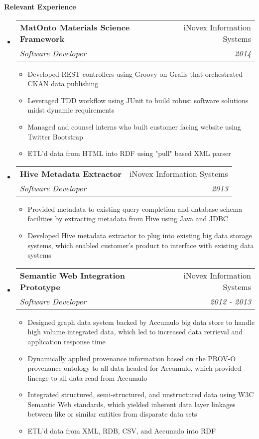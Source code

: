 \documentclass[letterpaper,11pt]{article}
\makeatletter
\newcommand{\resitem}[1]{\item #1 \vspace{-2pt}}
\newcommand{\resheading}[1]{{\large \colorbox{mygrey}{\begin{minipage}{\textwidth}{\textbf{#1 \vphantom{p\^{E}}}}\end{minipage}}}}
\newcommand{\ressubheading}[4]{
\begin{tabular*}{7.0in}{l@{\extracolsep{\fill}}r}
		\textbf{#1} & #2 \\
		\textit{#3} & \textit{#4} \\
\end{tabular*}\vspace{-6pt}}
\makeatother
\begin{document}
\resheading{Relevant Experience}
\begin{itemize}
	\item
	\ressubheading{MatOnto Materials Science Framework}{iNovex Information Systems}{Software Developer}{2014}
	\begin{itemize}
		\resitem{Developed REST controllers using Groovy on Grails that orchestrated CKAN data publishing}
		\resitem{Leveraged TDD workflow using JUnit to build robust software solutions midst dynamic requirements}
		\resitem{Managed and counsel interns who built customer facing website using Twitter Bootstrap}
		\resitem{ETL'd data from HTML into RDF using "pull" based XML parser}
	\end{itemize}

	\item
	\ressubheading{Hive Metadata Extractor}{iNovex Information Systems}{Software Developer}{2013}
	\begin{itemize}
		\resitem{Provided metadata to existing query completion and database schema facilities by extracting metadata from Hive using Java and JDBC}
		\resitem{Developed Hive metadata extractor to plug into existing big data storage systems, which enabled customer's product to interface with existing data systems}
	\end{itemize}
	
	\item
	\ressubheading{Semantic Web Integration Prototype}{iNovex Information Systems}{Software Developer}{2012 - 2013}
	\begin{itemize}
		\resitem{Designed graph data system backed by Accumulo big data store to handle high volume integrated data, which led to increased data retrieval and application response time}
		\resitem{Dynamically applied provenance information based on the PROV-O provenance ontology to all data headed for Accumulo, which provided lineage to all data read from Accumulo}
		\resitem{Integrated structured, semi-structured, and unstructured data using W3C Semantic Web standards, which yielded inherent data layer linkages between like or similar entities from disparate data sets}
		\resitem{ETL'd data from XML, RDB, CSV, and Accumulo into RDF}
	\end{itemize}
	
\end{itemize}
\end{document}
